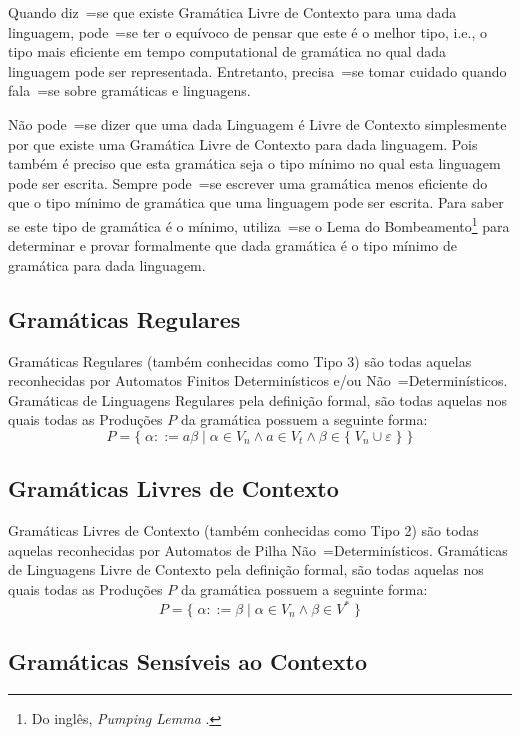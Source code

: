 Quando diz~=se que existe Gramática Livre de Contexto para uma dada linguagem,
pode~=se ter o equívoco de pensar que este é o melhor tipo,
i.e.,
o tipo mais eficiente em tempo computational de gramática no qual dada linguagem pode ser representada.
Entretanto,
precisa~=se tomar cuidado quando fala~=se sobre gramáticas e
linguagens.

Não pode~=se dizer que uma dada Linguagem é Livre de Contexto simplesmente por que existe uma Gramática Livre de Contexto para dada linguagem.
Pois também é preciso que esta gramática seja o tipo mínimo no qual esta linguagem pode ser escrita.
Sempre pode~=se escrever uma gramática menos eficiente do que o tipo mínimo de gramática que uma linguagem pode ser escrita.
Para saber se este tipo de gramática é o mínimo,
utiliza~=se o Lema do Bombeamento\footnote{
Do inglês, \textit{Pumping Lemma} \cite{hopcroftBook,sipserBook}.
}
para determinar e
provar formalmente que dada gramática é o tipo mínimo de gramática para dada linguagem.


\subsection{Gramáticas Regulares}

Gramáticas Regulares (também conhecidas como Tipo 3) são todas aquelas reconhecidas por Automatos Finitos Determinísticos e\slash{}ou Não~=Determinísticos.
Gramáticas de Linguagens Regulares pela definição formal,
são todas aquelas nos quais todas as Produções $P$ da gramática possuem a seguinte forma:
$$ P = \{\; \alpha ::= a \beta \;|\; \alpha \in V_n \land a \in V_t
            \land \beta \in \{\; V_n \cup \varepsilon\; \} \;\} $$

\subsection{Gramáticas Livres de Contexto}

Gramáticas Livres de Contexto (também conhecidas como Tipo 2) \cite{hopcroftBook} são todas aquelas reconhecidas por Automatos de Pilha Não~=Determinísticos.
Gramáticas de Linguagens Livre de Contexto pela definição formal,
são todas aquelas nos quais todas as Produções $P$ da gramática possuem a seguinte forma:
$$ P = \{\; \alpha ::= \beta \;|\; \alpha \in V_n \land \beta \in V^* \;\} $$


\subsection{Gramáticas Sensíveis ao Contexto}

